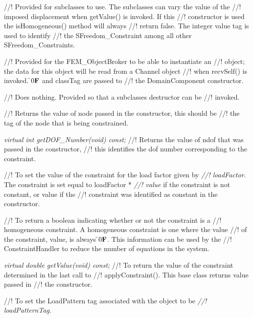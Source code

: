 //! Provided for subclasses to use. The subclasses can vary the value of the
//! imposed displacement when getValue() is invoked. If this
//! constructor is used the isHomogeneous() method will always
//! return \p false. The integer value \p tag is used to identify
//! the SFreedom\_Constraint among all other SFreedom\_Constraints.


//! Provided for the FEM\_ObjectBroker to be able to instantiate an
//! object; the data for this object will be read from a Channel object
//! when recvSelf() is invoked. \f$0{\bf F}$ and \p classTag are passed to
//! the DomainComponent constructor.


//! Does nothing. Provided so that a subclasses destructor can be
//! invoked.


//! Returns the value of \p node passed in the constructor, this should be 
//! the tag of the node that is being constrained.

{\em virtual int getDOF\_Number(void) const;}
//! Returns the value of \p ndof that was passed in the constructor,
//! this identifies the dof number corresponding to the constraint.

//! To set the value of the constraint for the load factor given by {\em
//! loadFactor}. The constraint is set equal to \p loadFactor * {\em
//! value} if the constraint is not constant, or \p value if the
//! constraint was identified as constant in the constructor.

//! To return a boolean indicating whether or not the constraint is a
//! homogeneous constraint. A homogeneous constraint is one where the value
//! of the constraint, \p value, is always \f$0{\bf F}$. This information can be used by the
//! ConstraintHandler to reduce the number of equations in the system.

{\em virtual double getValue(void) const;}
//! To return the value of the constraint determined in the last call to
//! applyConstraint(). This base class returns \p value passed in
//! the constructor. 

//! To set the LoadPattern tag associated with the object to be {\em
//! loadPatternTag}.

